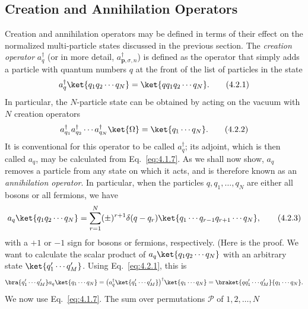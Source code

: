 
\subsection{Creation and Annihilation Operators}

Creation and annihilation operators may be defined in terms of their effect
on the normalized multi-particle states discussed in the previous section.
The \textit{creation operator} $a^\dagger_q$ (or in more detail, $a^\dagger_{\mathbf p,\sigma,n}$) is defined as the
operator that simply adds a particle with quantum numbers $q$ at the front
of the list of particles in the state
\begin{equation}
  a^\dagger_q\ket{q_1q_2\cdots q_N}=\ket{q q_1q_2\cdots q_N}.
  \tag{4.2.1}
  \label{eq:4.2.1}
\end{equation}
In particular, the $N$-particle state can be obtained by acting on the vacuum
with $N$ creation operators
\begin{equation}
  a^\dagger_{q_1}a^\dagger_{q_2}\cdots a^\dagger_{q_N}\ket{\Omega}
  =\ket{q_1\cdots q_N}.
  \tag{4.2.2}
  \label{eq:4.2.2}
\end{equation}
It is conventional for this operator to be called $a^\dagger_q$; its adjoint, which
is then called $a_q$, may be calculated from Eq.~\eqref{eq:4.1.7}. As we shall
now show, $a_q$ removes a particle from any state on which it acts, and
is therefore known as an \textit{annihilation operator}. In particular, when the
particles $q,q_1,\ldots,q_N$ are either all bosons or all fermions, we have
\begin{equation}
  a_q\ket{q_1q_2\cdots q_N}
  =\sum_{r=1}^{N}(\pm)^{r+1}\delta(q-q_r)
    \ket{q_1\cdots q_{r-1}q_{r+1}\cdots q_N},
  \tag{4.2.3}
  \label{eq:4.2.3}
\end{equation}
with a $+1$ or $-1$ sign for bosons or fermions, respectively. (Here is the
proof. We want to calculate the scalar product of $a_q\ket{q_1q_2\cdots q_N}$ with an
arbitrary state $\ket{q'_1\cdots q'_M}$. Using Eq.~\eqref{eq:4.2.1}, this is
\[
  \bra{q'_1\cdots q'_M}a_q\ket{q_1\cdots q_N}
  =\bigl(a^\dagger_q\ket{q'_1\cdots q'_M}\bigr)^\dagger
    \ket{q_1\cdots q_N}
  =\braket{q q'_1\cdots q'_M}{q_1\cdots q_N}.
\]
We now use Eq.~\eqref{eq:4.1.7}. The sum over permutations $\mathcal P$ of $1,2,\ldots,N$
